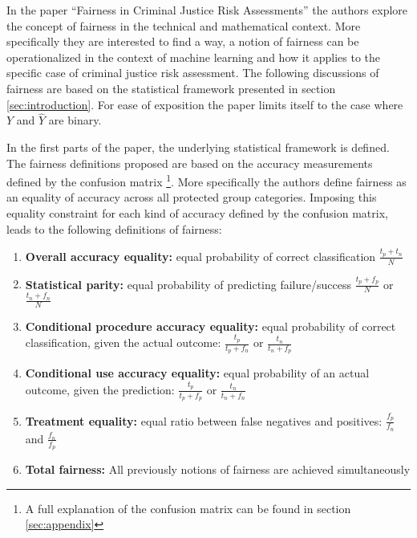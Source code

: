 In the paper \enquote{Fairness in Criminal Justice Risk Assessments} \cite{Berk.2018} 
the authors explore the concept of fairness in the technical and mathematical context. 
More specifically they are interested to find a way, a notion of fairness can be 
operationalized in the context of machine learning and how it applies to the specific
case of criminal justice risk assessment. The following discussions of fairness are based 
on the statistical framework presented in section \ref{sec:introduction}. For ease of 
exposition the paper limits itself to the case where $Y$ and $\hat{Y}$ are binary.


In the first parts of the paper, the underlying statistical framework is defined. The 
fairness definitions proposed are based on the accuracy measurements defined by the 
confusion matrix \footnote{ A full explanation of the confusion matrix can be found in 
section \ref{sec:appendix}}. More specifically the authors define fairness as an equality 
of accuracy across all protected group categories. Imposing this equality constraint for 
each kind of accuracy defined by the confusion matrix, leads to the following definitions 
of fairness: 

\begin{enumerate}
    \item \textbf{Overall accuracy equality:} equal probability of correct classification 
    $\frac{t_p + t_n}{N}$ 
    \item \textbf{Statistical parity:} equal probability of predicting failure/success 
    $\frac{t_p + f_p}{N}$ or $\frac{t_n + f_n}{N}$
    \item \textbf{Conditional procedure accuracy equality:} equal probability of correct 
    classification, given the actual outcome: $\frac{t_p}{t_p + f_n}$ or 
    $\frac{t_n}{t_n + f_p}$
    \item \textbf{Conditional use accuracy equality:} equal probability of an actual 
    outcome, given the prediction: $\frac{t_p}{t_p + f_p}$ or $\frac{t_n}{t_n + f_n}$
    \item \textbf{Treatment equality:} equal ratio between false negatives and positives: 
    $\frac{f_p}{f_n}$ and $\frac{f_n}{f_p}$
    \item \textbf{Total fairness:} All previously notions of fairness are achieved 
    simultaneously
\end{enumerate}

